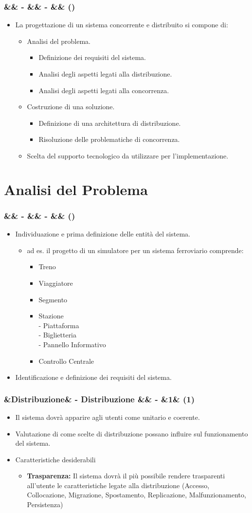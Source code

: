 \documentclass[slidestop,compress,blackandwhite]{beamer}
\newcommand{\itemB}[3]{
	\item \textbf{#1} #2 \vspace{#3}
}
\newcommand{\cm}[1]{\vspace{#1cm}}
\newcommand{\newtitle}[4]{
	#1 
	\ifx&#2&%
	\else
  		\large- #2
	\fi
	\ifx&#3&%
	\else
  		\normalsize- #3
	\fi
	\ifx&#4&%
	\else
  		\normalsize (#4)
	\fi
}
\newcommand{\newframe}[5]{
	\begin{frame}
		\frametitle{\newtitle{#1}{#2}{#3}{#4}}
		#5
	\end{frame}
}
\newcommand{\myitemize}[1]{
	\begin{itemize}\itemsep4pt
	#1
	\end{itemize}
}
\begin{document}
	\newframe{}{}{}{}{
		
		\myitemize {
			\item La progettazione di un sistema concorrente e distribuito si compone di:
				\cm{0.2}
				\myitemize {
					\item Analisi del problema.
						\cm{0.2}
						\myitemize {
							\item Definizione dei requisiti del sistema.
							\item Analisi degli aspetti legati alla distribuzione.
							\item Analisi degli aspetti legati alla concorrenza.
						}
					\cm{0.2}
					\item Costruzione di una soluzione.
					\cm{0.2}	
						\myitemize {
							\item Definizione di una architettura di distribuzione.
							\item Risoluzione delle problematiche di concorrenza.
						}
					\cm{0.2}
					\item Scelta del supporto tecnologico da utilizzare per l'implementazione.
				}
		}
	}

\section{Analisi del Problema}\label{analisis}
	\newframe{}{}{}{}{
		\myitemize {
			\item Individuazione e prima definizione delle entità del sistema.
				\myitemize {
					\item ad es. il progetto di un simulatore per un sistema ferroviario comprende:
						\myitemize{
							\item Treno
							\item Viaggiatore
							\item Segmento
							\item Stazione\\\cm{0.1}
								- Piattaforma\\ \cm{0.1}
								- Biglietteria\\ \cm{0.1}
								- Pannello Informativo
							\item Controllo Centrale
						}
				}
			\item Identificazione e definizione dei requisiti del sistema.
		}
	}
	
	\newframe{}{Distribuzione}{}{1}{
		\cm{0.3}
		\myitemize {
			\cm{0.2}
			\item Il sistema dovrà apparire agli utenti come unitario e coerente. 
			\cm{0.2}
			\item Valutazione di come scelte di distribuzione possano influire sul funzionamento del sistema.
			\cm{0.2}
			\item Caratteristiche desiderabili
				\myitemize {
					\itemB{Trasparenza:}{Il sistema dovrà il più possibile rendere trasparenti all'utente le caratteristiche legate alla distribuzione (Accesso, Collocazione, Migrazione, Spostamento, Replicazione, Malfunzionamento, Persistenza)}{0.1cm}
				}
		}
	}
	
\end{document}
